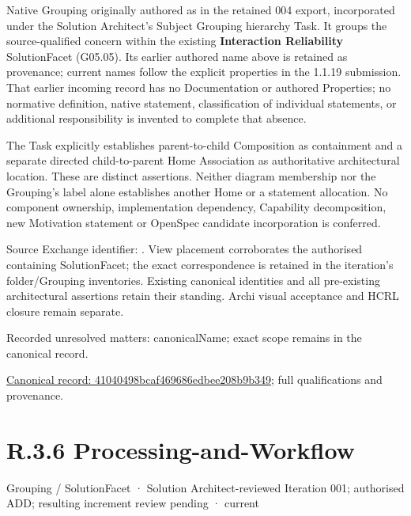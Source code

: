 Native Grouping originally authored as \texttt{} in the retained 004 export,
incorporated under the Solution Architect's Subject Grouping hierarchy Task.
It groups the source-qualified \texttt{} concern within
the existing \textbf{Interaction Reliability} SolutionFacet (G05.05). Its earlier authored name above is retained as provenance; current names
follow the explicit properties in the 1.1.19 submission.
That earlier incoming record has no Documentation or authored Properties; no normative
definition, native statement, classification of individual statements, or
additional responsibility is invented to complete that absence.



The Task explicitly establishes parent-to-child Composition as containment and
a separate directed child-to-parent Home Association as authoritative architectural
location. These are distinct assertions. Neither diagram membership nor the
Grouping's label alone establishes another Home or a statement allocation.
No component ownership, implementation dependency, Capability decomposition,
new Motivation statement or OpenSpec candidate incorporation is conferred.



Source Exchange identifier: \texttt{}. View placement corroborates
the authorised containing SolutionFacet; the exact correspondence is retained in the
iteration's folder/Grouping inventories. Existing canonical identities and all
pre-existing architectural assertions retain their standing. Archi visual
acceptance and HCRL closure remain separate.


{\small Recorded unresolved matters: canonicalName; exact scope remains in the canonical record.}\par
{\footnotesize \href{../../../../../../../continuum/grouping/41040498bcaf469686edbee208b9b349.md}{Canonical record: 41040498bcaf469686edbee208b9b349}; full qualifications and provenance.}\par
\section*{R.3.6 Processing-and-Workflow}
\label{navigation:R.3.6}

\label{element:afb9686c9f1c48159d92a518a7d17452}
{\small Grouping / SolutionFacet · Solution Architect-reviewed Iteration 001; authorised ADD; resulting increment review pending · current}\par

